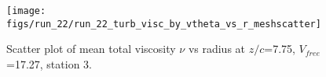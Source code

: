 \begin{figure}[H]
\centering
\texttt{[image: figs/run\_22/run\_22\_turb\_visc\_by\_vtheta\_vs\_r\_meshscatter]}
\caption{Scatter plot of mean total viscosity $\nu$ vs radius at $z/c$=7.75, $V_{free}$=17.27, station 3.}
\label{fig:run_22_turb_visc_by_vtheta_vs_r_meshscatter}
\end{figure}


